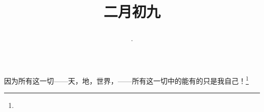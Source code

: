 \title{\date[d=18,m=3,y=2024][year:cn-y,年,month:cn,day:cn,日,·,weekday]·二月初九 }
因为所有这一切——天，地，世界，——所有这一切中的能有的只是我自己！\footnote{ }

